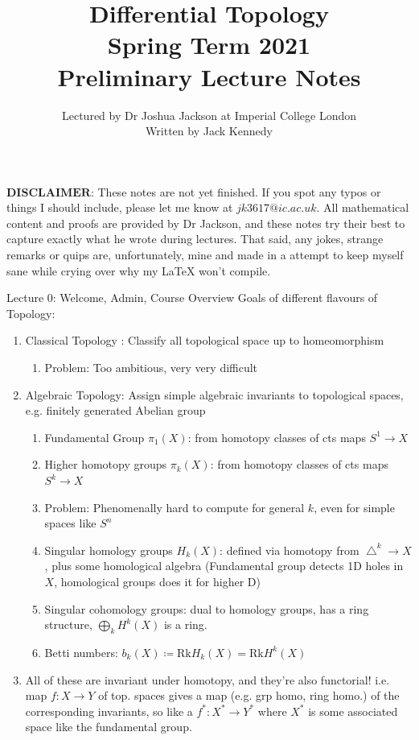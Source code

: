 \documentclass[10pt]{article}
\title {Differential Topology\\Spring Term 2021\\
Preliminary Lecture Notes}
\author{Lectured by Dr Joshua Jackson at Imperial College London\\
Written by Jack Kennedy}
\date{}
\theoremstyle{plain}
\theoremstyle{definition}
\begin{document}
\maketitle
\tableofcontents
\newpage
$\textbf{DISCLAIMER}$: These notes are not yet finished. If you spot any typos or things I should include, please let me know at $\textit{jk3617@ic.ac.uk}$. All mathematical content and proofs are provided by Dr Jackson, and these notes try their best to capture exactly what he wrote during lectures. That said, any jokes, strange remarks or quips are, unfortunately, mine and made in a attempt to keep myself sane while crying over why my LaTeX won't compile.

\begin{section}{Lecture 0: Welcome, Admin, Course Overview}
{Goals of different flavours of Topology:}
\begin{enumerate}
    \item Classical Topology : Classify all topological space up to homeomorphism 
    \begin{enumerate}[]
        \item Problem: Too ambitious, very very difficult
    \end{enumerate}
    \item Algebraic Topology: Assign simple algebraic invariants to topological spaces, e.g. finitely generated Abelian group 
    \begin{enumerate}
        \item Fundamental Group $\pi_1(X)$: from homotopy classes of cts maps ${S}^1 \to X$
        \item Higher homotopy groups $\pi_k(X)$: from homotopy classes of cts maps $S^k \to X$
        \item[] Problem: Phenomenally hard to compute for general $k$, even for simple spaces like $S^n$
        \item Singular homology groups $H_k(X)$: defined via homotopy from $\bigtriangleup^k \to X $, plus some homological algebra (Fundamental group detects 1D holes in $X$, homological groups does it for higher D)
        \item Singular cohomology groups: dual to homology groups, has a ring structure, $\bigoplus\limits_
        k H^k(X)$ is a ring.
        \item Betti numbers: $b_k(X) \coloneqq \text{Rk} H_k(X) = \text{Rk} H^k(X)$
    \end{enumerate}
    \item[] All of these are invariant under homotopy, and they're also functorial! i.e. map $f : X\to Y$ of top. spaces gives a map (e.g. grp homo, ring homo.) of the corresponding invariants, so like a $f^* : X^* \to Y^*$ where $X^*$ is some associated space like the fundamental group. 

\end{enumerate}
\end{section}
\end{document}
